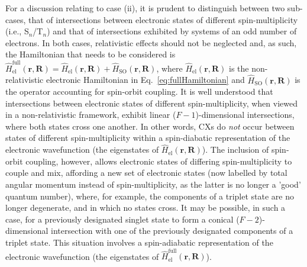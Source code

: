 \documentclass[9pt,bestpractices,pubversion]{livecoms}
\newcommand{\R}{\mathbf{R}}
\newcommand{\re}{\mathbf{r}}
\begin{document}
For a discussion relating to case (ii), it is prudent to distinguish between two sub-cases, that of intersections between electronic states of different spin-multiplicity (i.e., S$_n$/T$_n$) and that of intersections exhibited by systems of an odd number of electrons.
In both cases, relativistic effects should not be neglected and, as such, the Hamiltonian that needs to be considered is $\hat{H}_{\text{el}}^\text{full}(\re,\R) = \hat{H}_{\text{el}}(\re,\R) + \hat{H}_{\text{SO}}(\re,\R)$, where $\hat{H}_{\text{el}}(\re,\R)$ is the non-relativistic electronic Hamiltonian in Eq.~\eqref{eq:fullHamiltonian} and $\hat{H}_{\text{SO}}(\re,\R)$ is the operator accounting for spin-orbit coupling.
It is well understood that intersections between electronic states of different spin-multiplicity, when viewed in a non-relativistic framework, exhibit linear ($F - 1$)-dimensional intersections, where both states cross one another.\cite{matsika2002conical, matsunaga2004modelling}
In other words, CXs do \textit{not} occur between states of different spin-multiplicity within a spin-diabatic representation of the electronic wavefunction (the eigenstates of $\hat{H}_{\text{el}}(\re,\R)$).
The inclusion of spin-orbit coupling, however, allows electronic states of differing spin-multiplicity to couple and mix, affording a new set of electronic states (now labelled by total angular momentum instead of spin-multiplicity, as the latter is no longer a 'good' quantum number\cite{Curchodatmophotochem2024}), where, for example, the components of a triplet state are no longer degenerate, and in which no states cross.
It may be possible, in such a case, for a previously designated singlet state to form a conical ($F - 2$)-dimensional intersection with one of the previously designated components of a triplet state.
This situation involves a spin-adiabatic representation of the electronic wavefunction (the eigenstates of $\hat{H}_{\text{el}}^\text{full}(\re,\R)$).
\end{document}
